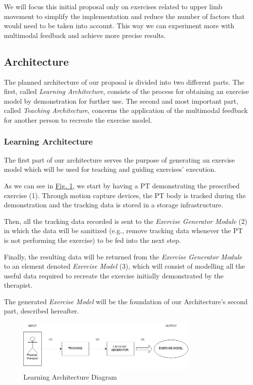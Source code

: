 We will focus this initial proposal only on exercises related to upper limb movement to simplify the implementation and reduce the number of factors that would need to be taken into account. This way we can experiment more with multimodal feedback and achieve more precise results.


\subsection{Architecture}
\label{section-approach-architecture}

The planned architecture of our proposal is divided into two different parts. 
The first, called \emph{Learning Architecture}, consists of the process for obtaining an exercise model by demonstration for further use.
The second and most important part, called \emph{Teaching Architecture}, concerns the application of the multimodal feedback for another person to recreate the exercise model.


\subsubsection{Learning Architecture}

The first part of our architecture serves the purpose of generating an exercise model which will be used for teaching and guiding exercises' execution.

As we can see in \hyperref[fig:learning]{Fig. \ref{fig:learning}}, we start by having a \ac{PT} demonstrating the prescribed exercise (1). Through motion capture devices, the \ac{PT} body is tracked during the demonstration and the tracking data is stored in a storage infrastructure.

Then, all the tracking data recorded is sent to the \emph{Exercise Generator Module} (2) in which the data will be sanitized (e.g., remove tracking data whenever the \ac{PT} is not performing the exercise) to be fed into the next step.

Finally, the resulting data will be returned from the \emph{Exercise Generator Module} to an element denoted \emph{Exercise Model} (3), which will consist of modelling all the useful data required to recreate the exercise initially demonstrated by the therapist. 

The generated \emph{Exercise Model} will be the foundation of our Architecture's second part, described hereafter.


\begin{figure}
	\centering
	\includegraphics[width=0.8\textwidth]{imgs/LearningPhase}
	\caption{Learning Architecture Diagram}
	\label{fig:learning}
\end{figure}


